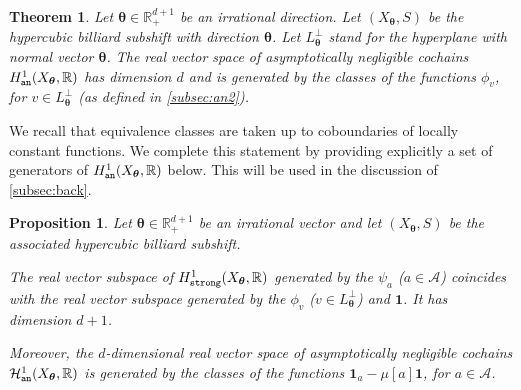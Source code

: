 \documentclass{article}
\newcommand{\tcb}{\textcolor{blue}}
\newtheorem{theorem}[lemma]{Theorem}
\newtheorem{proposition}[lemma]{Proposition}
\theoremstyle{definition}
\newcommand{\cH}{\mathcal{H}}
\newcommand{\btheta}{\boldsymbol{\theta}}
\begin{document}
\begin{theorem}\cite[Theorem 1.3]{Kell.Sad.17}\label{dim-asymptot-neglig}
Let $\btheta \in  {\mathbb R}^{d+1}_+$ be an irrational  direction.
Let $(X_{\btheta},S)$ be the hypercubic billiard  subshift with direction $\btheta$.  Let $L_{\btheta}^\perp$ stand for the hyperplane with normal vector $\btheta$. The  real vector space of asymptotically negligible cochains $H^1_{\tt an}(X_{\btheta},\mathbb R)$  has  dimension $d$ and is generated by the  classes of the functions $\phi_v$, for $v \in L_{\btheta}^\perp$ (as defined in \cref{subsec:an2}).
\end{theorem}
We recall that  equivalence classes are taken up to coboundaries of locally  constant  functions.
We complete this statement   by providing  explicitly a  set of generators
of $H^1_{\tt an}(X_{\btheta},\mathbb R)$  below.  This will be used in the discussion of \cref{subsec:back}.

\begin{proposition}\label{thm-cohom-an}
Let ${\btheta} \in {\mathbb R}^{d+1}_+$ be an irrational vector and 
let $(X_{\btheta},S)$ be  the associated  hypercubic billiard  subshift. 

The  real  vector  subspace  of $H^1_{\tt strong}(X_{\btheta},\mathbb R)$ generated by the $\psi_a$ ($a \in \mathcal A$)  coincides with the 
 real   vector subspace generated by the $\phi_v$ ($v \in L_{\btheta}^\perp$) and $\mathbf 1$.  It has dimension $d+1$.
 
Moreover,  the  $d$-dimensional real vector space of asymptotically negligible cochains $\cH^1_{\tt an}(X_{\btheta}, {\mathbb R})$ is generated by  the classes of the  functions  ${\mathbf 1}_a - \mu[a] {\mathbf 1}$,  for $a  \in \mathcal A$.
\end{proposition}
\end{document}
